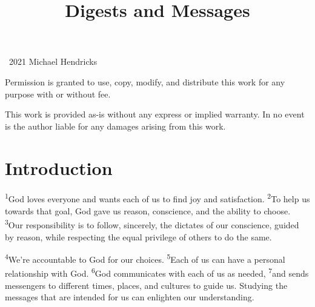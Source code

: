 \documentclass[openany,12pt,english]{book}
\title{Di\-gests and Mes\-sages}
\author{}
\date{}
\newenvironment{para}{\par\pretolerance=100\tolerance=200\setlength{\emergencystretch}{0.6em}\relax}{\par}
\begin{document}
\maketitle

{
\thispagestyle{empty}
\vspace*{\fill}
\begin{changemargin}{.5in}{.5in}
\begin{center}
\textcopyright{}~2021 Michael Hendricks

\vspace{0.5\baselineskip}

Permission is granted to use, copy, modify, and distribute
this work for any purpose with or without fee.

\vspace{0.5\baselineskip}

This work is provided as-is without any express or implied
warranty. In no event is the author liable for any damages
arising from this work.
\end{center}
\end{changemargin}
}
\clearpage{}

\tableofcontents
\clearpage{}

\markboth{}{}


\chapter*{Introduction}
\begin{para}
    \textsuperscript{1}\thinspace{}God loves eve\-ry\-one and wants each of us to find joy and sat\-is\-fac\-tion.
    \textsuperscript{2}\thinspace{}To help us to\-wards that goal, God gave us rea\-son, con\-science, and the a\-bil\-i\-ty to choose.
    \textsuperscript{3}\thinspace{}Our re\-spon\-si\-bil\-i\-ty is to fol\-low, sin\-cere\-ly, the dictates of our con\-science, guid\-ed by rea\-son, while re\-spect\-ing the e\-qual priv\-i\-lege of others to do the same.
\end{para}

\begin{para}
    \textsuperscript{4}\thinspace{}We're ac\-count\-a\-ble to God for our choices.
    \textsuperscript{5}\thinspace{}Each of us can have a per\-son\-al re\-la\-tion\-ship with God.
    \textsuperscript{6}\thinspace{}God communicates with each of us as needed,
    \textsuperscript{7}\thinspace{}and sends messengers to dif\-fer\-ent times, places, and cultures to guide us. Stud\-y\-ing the messages that are in\-tend\-ed for us can en\-light\-en our un\-der\-stand\-ing.
\end{para}
\end{document}
